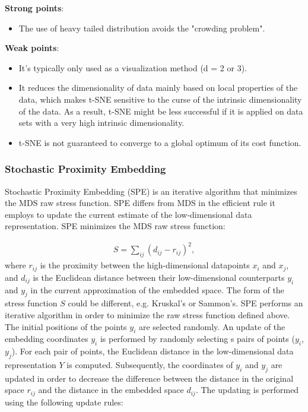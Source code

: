 \documentclass[a4paper]{article}
\begin{document}
\textbf{Strong points}:
\begin{itemize}
  \item The use of heavy tailed distribution avoids the "crowding problem".
\end{itemize}

\textbf{Weak points}:
\begin{itemize}
  \item It's typically only used as a visualization method (d = 2 or
    3).
  \item It reduces the dimensionality of data mainly based on
local properties of the data, which makes t-SNE sensitive to the curse
of the intrinsic dimensionality of the data. As a result, t-SNE might be less successful if it is applied on data sets with a very high intrinsic dimensionality.
  \item t-SNE is not guaranteed to converge to a global optimum of its
    cost function.
\end{itemize}

\subsubsection{Stochastic Proximity Embedding}

Stochastic Proximity Embedding (SPE) is an iterative algorithm that
minimizes the MDS raw stress function. SPE differs from MDS in the
efficient rule it employs to update the current estimate of the
low-dimensional data representation. SPE minimizes the MDS raw stress function:

\begin{align*}
  S=\sum_{ij}(d_{ij}-r_{ij})^2,
\end{align*}
where $r_{ij}$ is the proximity between the high-dimensional
datapoints $x_i$ and $x_j$, and $d_{ij}$ is the Euclidean distance between their low-dimensional counterparts $y_i$ and $y_j$ in the current approximation of the
embedded space. The form of the stress function $S$ could be
different, e.g.  Kruskal's or Sammon's. SPE performs an iterative algorithm in order to minimize the raw stress function defined above. The initial positions
of the points $y_i$ are selected randomly. An update of the embedding coordinates $y_i$ is performed by randomly
selecting s pairs of points ($y_i$, $y_j$). For each pair of points, the Euclidean distance in the low-dimensional data representation
$Y$ is computed. Subsequently, the coordinates of $y_i$ and $y_j$ are updated in order to decrease the difference
between the distance in the original space $r_{ij}$ and the distance
in the embedded space $d_{ij}$. The updating is performed using the following update rules:
\end{document}
